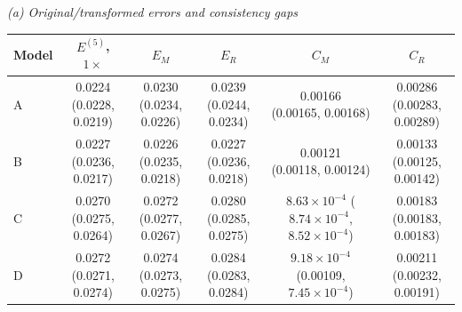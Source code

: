 {\small\textit{(a) Original/transformed errors and consistency gaps}}\par\vspace{2pt}
\par\begingroup\centering\fontsize{8.5}{10.5}\selectfont\setlength{\parskip}{0pt}\setlength{\tabcolsep}{4pt}
\begin{tabular}{@{}lccccc@{}}
\toprule
Model & $E^{(5)}$, $1\times$ & $E_M$ & $E_R$ & $C_M$ & $C_R$ \\
\midrule
A & \shortstack{0.0224\\[-1pt](0.0228, 0.0219)} & \shortstack{0.0230\\[-1pt](0.0234, 0.0226)} & \shortstack{0.0239\\[-1pt](0.0244, 0.0234)} & \shortstack{0.00166\\[-1pt](0.00165, 0.00168)} & \shortstack{0.00286\\[-1pt](0.00283, 0.00289)} \\
B & \shortstack{0.0227\\[-1pt](0.0236, 0.0217)} & \shortstack{0.0226\\[-1pt](0.0235, 0.0218)} & \shortstack{0.0227\\[-1pt](0.0236, 0.0218)} & \shortstack{0.00121\\[-1pt](0.00118, 0.00124)} & \shortstack{0.00133\\[-1pt](0.00125, 0.00142)} \\
C & \shortstack{0.0270\\[-1pt](0.0275, 0.0264)} & \shortstack{0.0272\\[-1pt](0.0277, 0.0267)} & \shortstack{0.0280\\[-1pt](0.0285, 0.0275)} & \shortstack{$8.63\!\times\!10^{-4}$\\[-1pt]($8.74\!\times\!10^{-4}$, $8.52\!\times\!10^{-4}$)} & \shortstack{0.00183\\[-1pt](0.00183, 0.00183)} \\
D & \shortstack{0.0272\\[-1pt](0.0271, 0.0274)} & \shortstack{0.0274\\[-1pt](0.0273, 0.0275)} & \shortstack{0.0284\\[-1pt](0.0283, 0.0284)} & \shortstack{$9.18\!\times\!10^{-4}$\\[-1pt](0.00109, $7.45\!\times\!10^{-4}$)} & \shortstack{0.00211\\[-1pt](0.00232, 0.00191)} \\
\bottomrule
\end{tabular}\par\endgroup\vspace{5pt}
